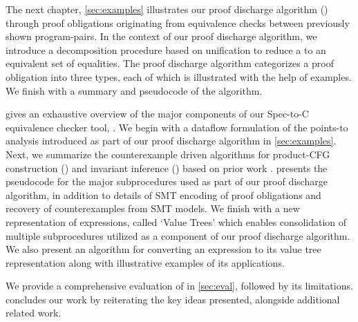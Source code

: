 The next chapter, \cref{sec:examples} illustrates our proof discharge algorithm () through
proof obligations originating from equivalence checks between previously shown program-pairs.
In the context of our proof discharge algorithm, we introduce a decomposition procedure based on unification
to reduce a \recursiveRelation{} to an equivalent set of equalities.
The proof discharge algorithm categorizes a proof obligation into three types, each of which is
illustrated with the help of examples.
We finish with a summary and pseudocode of the algorithm.

 gives an exhaustive overview of the major components of our Spec-to-C equivalence checker tool, \toolName{}.
We begin with a dataflow formulation of the points-to analysis introduced as part of our proof discharge algorithm in \cref{sec:examples}.
Next, we summarize the counterexample driven algorithms for product-CFG construction ()
and invariant inference () based on prior work \cite{shubhanipdhthesis}.
 presents the pseudocode for the major subprocedures used as part of our
proof discharge algorithm, in addition to details of SMT encoding of proof obligations and
recovery of counterexamples from SMT models.
We finish with a new representation of expressions, called `Value Trees' which enables consolidation
of multiple subprocedures utilized as a component of our proof discharge algorithm.
We also present an algorithm for converting an expression to its value tree representation
along with illustrative examples of its applications.

We provide a comprehensive evaluation of \toolName{} in \cref{sec:eval}, followed by its limitations.
 concludes our work by reiterating the key ideas presented, alongside additional related work.
